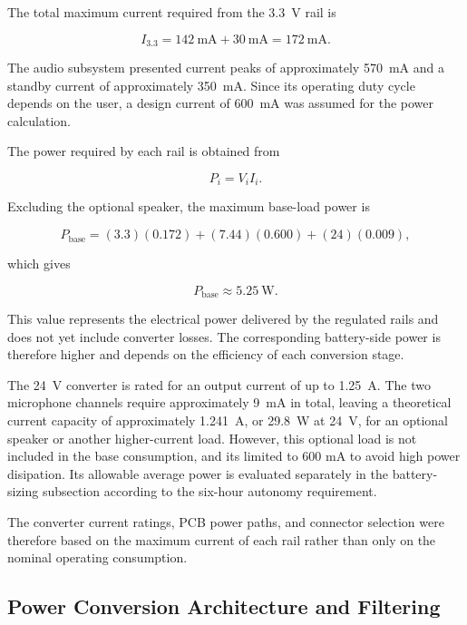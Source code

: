 The total maximum current required from the 3.3~V rail is

\begin{equation}
I_{3.3}
=
142~\mathrm{mA}
+
30~\mathrm{mA}
=
172~\mathrm{mA}.
\end{equation}

The audio subsystem presented current peaks of approximately 570~mA and a standby current of approximately 350~mA. Since its operating duty cycle depends on the user, a design current of 600~mA was assumed for the power calculation.

The power required by each rail is obtained from

\begin{equation}
P_i = V_i I_i.
\end{equation}

Excluding the optional speaker, the maximum base-load power is

\begin{equation}
P_{\mathrm{base}}
=
(3.3)(0.172)
+
(7.44)(0.600)
+
(24)(0.009),
\end{equation}

which gives

\begin{equation}
P_{\mathrm{base}} \approx 5.25~\mathrm{W}.
\end{equation}

This value represents the electrical power delivered by the regulated rails and does not yet include converter losses. The corresponding battery-side power is therefore higher and depends on the efficiency of each conversion stage.

The 24~V converter is rated for an output current of up to 1.25~A. The two microphone channels require approximately 9~mA in total, leaving a theoretical current capacity of approximately 1.241~A, or 29.8~W at 24~V, for an optional speaker or another higher-current load. However, this optional load is not included in the base consumption, and its limited to 600 mA to avoid high power disipation. Its allowable average power is evaluated separately in the battery-sizing subsection according to the six-hour autonomy requirement.

The converter current ratings, PCB power paths, and connector selection were therefore based on the maximum current of each rail rather than only on the nominal operating consumption.
\subsection{Power Conversion Architecture and Filtering}

